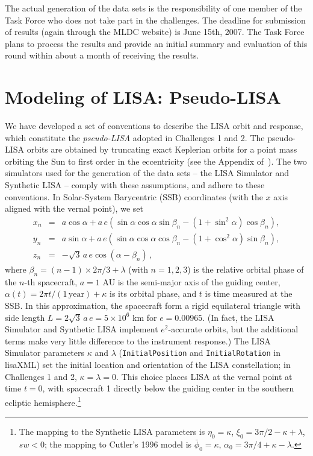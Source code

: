 \documentclass{iopart}
\begin{document}
The actual generation of the data sets is the responsibility of one member of the Task Force who does not take part in the challenges. The deadline for submission of results (again through the MLDC website) is June 15th, 2007. The Task Force plans to process the results and provide an initial summary and evaluation of this round within about a month of receiving the results.

\section{Modeling of LISA: Pseudo-LISA}
\label{s:lisa}

We have developed a set of conventions to describe the LISA orbit and response, which constitute the \emph{pseudo-LISA} adopted in Challenges 1 and 2. The pseudo-LISA orbits are obtained by truncating exact Keplerian orbits for a point mass orbiting the Sun to first order in the eccentricity (see the Appendix of~\cite{lisasimulator}). The two simulators used for the generation of the data sets -- the LISA Simulator \cite{lisasimulator} and Synthetic LISA \cite{synthlisa} -- comply with these assumptions, and adhere to these conventions. In Solar-System Barycentric (SSB) coordinates (with the $x$ axis aligned with the vernal point), we set
%
\begin{eqnarray}
x_n &=& a\cos \alpha + a \, e\left(\sin\alpha\cos\alpha\sin\beta_n
-(1+\sin^2\alpha)\cos\beta_n\right), \nonumber \\
y_n &=& a\sin \alpha + a \, e\left(\sin\alpha\cos\alpha\cos\beta_n
-(1+\cos^2\alpha)\sin\beta_n\right), \\
z_n & = & -\sqrt{3} \, a \, e \cos(\alpha-\beta_n) \, , \nonumber
\end{eqnarray}
%
where $\beta_n = (n-1)\times2\pi/3 + \lambda$ (with $n=1, 2, 3$) is the relative orbital phase of the $n$-th spacecraft, $a = 1$ AU is the semi-major axis of the guiding center, $\alpha(t)=2 \pi t / (1 \, \mathrm{year}) + \kappa$ is its orbital phase, and $t$ is time measured at the SSB. In this approximation, the spacecraft form a rigid equilateral triangle with side length $L = 2\sqrt{3} \, a \, e = 5\times 10^6$ km for $e=0.00965$. (In fact, the LISA Simulator and Synthetic LISA implement $e^2$-accurate orbits, but the additional terms make very little difference to the instrument response.) The LISA Simulator parameters $\kappa$ and $\lambda$ (\texttt{InitialPosition} and \texttt{InitialRotation} in lisaXML) set the initial location and orientation of the LISA constellation; in Challenges 1 and 2, $\kappa=\lambda=0$. This choice places LISA at the vernal point at time $t=0$, with spacecraft 1 directly below the guiding center in the southern ecliptic hemisphere.\footnote{The mapping to the Synthetic LISA \cite{synthlisa} parameters is $\eta_0 = \kappa$, $\xi_0 = 3\pi/2 - \kappa + \lambda$, $sw < 0$; the mapping to Cutler's 1996 model \cite{cutler98} is $\bar{\phi}_0 = \kappa$, $\alpha_0 = 3\pi/4 + \kappa - \lambda$.}
\end{document}

